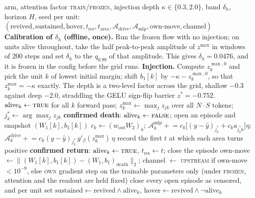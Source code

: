 \documentclass[11pt]{article}
\theoremstyle{definition}
\theoremstyle{remark}
\newcommand{\Ar}{\mathcal{A}}                      %
\begin{document}
\begin{algorithm}[t]
\caption{Hysteresis counter with sustained return (transformer block).}
\label{alg:hist}
\begin{algorithmic}[1]
\REQUIRE arm, attention factor \textsc{train}/\textsc{frozen}, injection depth
$\kappa\in\{0.3,2.0\}$, band $\delta_h$, horizon $H$, seed
\ENSURE per unit: $(\text{revived},\text{sustained},\text{hover},
t_{\mathrm{res}},t_{\mathrm{area}},\Ar_{\mathrm{drive}},\Ar_{\mathrm{mlp}},
\text{own-move},\text{channel})$
\STATE \textbf{Calibration of $\delta_h$ (offline, once).} Run the frozen flow
with no injection; on units alive throughout, take the half peak-to-peak
amplitude of $z^{\max}$ in windows of $200$ steps and set $\delta_h$ to the
$q_{0.99}$ of that amplitude. This gives $\delta_h=0.0476$, and it is frozen in
the config before the grid runs.
\STATE \textbf{Injection.} Compute $z^{\max,0}_k$ and pick the unit $k$ of lowest
initial margin; shift $b_1[k]$ by $-\kappa-z^{\max,0}_k$, so that
$z^{\max}_k=-\kappa$ exactly. The depth is a two-level factor across the grid,
shallow $-0.3$ against deep $-2.0$, straddling the GELU sign-flip barrier
$z^\ast=-0.752$.
\STATE $\mathrm{alive}_k\leftarrow\textsc{true}$ for all $k$
  \STATE forward pass; $z^{\max}_k\leftarrow\max_j z_{jk}$ over all $N\!\cdot\!S$
         tokens; $j^\ast_k\leftarrow\arg\max_j z_{jk}$
    \STATE \textbf{confirmed death}: $\mathrm{alive}_k\leftarrow\textsc{false}$;
           open an episode and snapshot $(W_1[k],b_1[k])$
  \ENDFOR
    \STATE $c_k\leftarrow(w_{\mathrm{out}}W_2)_k$;
           $\Ar^{\mathrm{mlp}}_k\mathrel{+}=
            c_k\bigl[(y-\hat y)_{j^\ast_k}+c_k a_{j^\ast_k k}\bigr]\eta$;
           $\Ar^{\mathrm{drive}}_k\mathrel{+}=
            c_k(y-\hat y)_{j^\ast_k}\,g'_\beta(z^{\max}_k)\,\eta$
    \STATE record the first $t$ at which each area turns positive
  \ENDFOR
    \STATE \textbf{confirmed return}: $\mathrm{alive}_k\leftarrow\textsc{true}$,
           $t_{\mathrm{res}}\leftarrow t$; close the episode
    \STATE own-move $\leftarrow\|(W_1[k],b_1[k])-(W_1,b_1)_{\mathrm{death}}\|_2$;
           channel $\leftarrow$ \textsc{upstream} if own-move $<10^{-9}$, else
           \textsc{own}
  \ENDFOR
  \STATE gradient step on the trainable parameters only (under
         \textsc{frozen}, attention and the readout are held fixed)
\ENDFOR
\STATE close every open episode as censored, and per unit set
       $\text{sustained}\leftarrow\text{revived}\wedge\mathrm{alive}_k$,
       $\text{hover}\leftarrow\text{revived}\wedge\neg\mathrm{alive}_k$
\end{algorithmic}
\end{algorithm}
\end{document}
